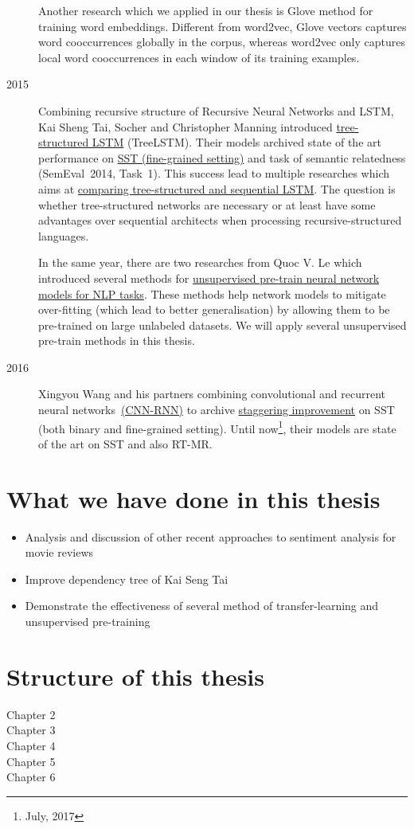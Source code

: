 \begin{description}
Another research which we applied in our thesis is Glove method for training word embeddings\cite{glove}.
Different from word2vec, Glove vectors captures word cooccurrences globally in the corpus, whereas word2vec only captures local word cooccurrences in each window of its training examples\cite{glove}.

\item [2015] Combining recursive structure of Recursive Neural Networks\cite{socher2013recursive} and LSTM\cite{originLSTM}, Kai Sheng Tai, Socher and Christopher Manning introduced \hyperref[sec:treelstm]{tree-structured LSTM}  (TreeLSTM)\cite{treeLSTM}.
Their models archived state of the art performance on \hyperref[sec:sst]{SST (fine-grained setting)} and task of semantic relatedness (SemEval~2014, Task~1\cite{SemeEvalTask1}).
This success lead to multiple researches\cite{need-tree}\cite{bowman-treevslstm}\cite{Graves_Nature2016} which aims at \hyperref[treelstm-advantage]{comparing tree-structured and sequential LSTM}. 
The question is whether tree-structured networks are necessary or at least have some advantages over sequential architects when processing recursive-structured languages\cite{need-tree}\cite{bowman-treevslstm}.   

In the same year, there are two researches\cite{ParagraphVec}\cite{semisup-seq2seq} from Quoc V. Le which introduced several methods for \hyperref[sec:unsupervised-pretrain]{unsupervised pre-train neural network models for NLP tasks}.
These methods help network models to mitigate over-fitting (which lead to better generalisation) by allowing them to be pre-trained on large unlabeled datasets.
We will apply several unsupervised pre-train methods in this thesis.

\item [2016] Xingyou Wang and his partners combining convolutional and recurrent neural networks~\hyperref[cnn-rnn]{(CNN-RNN)} to archive \hyperref[table:cnn-rnn]{staggering improvement} on SST (both binary and fine-grained setting).
Until now\footnote{July, 2017}, their models are state of the art on SST and also RT-MR\cite{cnn-rnn}.
\end{description}  

\section{What we have done in this thesis}
\begin{itemize}
\item Analysis and discussion of other recent approaches to sentiment analysis for movie reviews 
\item Improve dependency tree of Kai Seng Tai
\item Demonstrate the effectiveness of several method of transfer-learning and unsupervised pre-training  
\end{itemize}

\section{Structure of this thesis}
\begin{description}
\item [Chapter 2] \blindtext
\item [Chapter 3] \blindtext
\item [Chapter 4] \blindtext
\item [Chapter 5] \blindtext
\item [Chapter 6] \blindtext
\end{description}